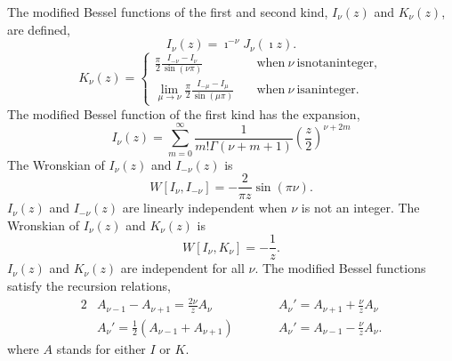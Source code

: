 \begin{Result}
  The modified Bessel functions of the first and second kind, $I_\nu(z)$ and 
  $K_\nu(z)$, are defined,
  \[ 
  I_\nu(z) = \imath^{-\nu} J_\nu(\imath z). 
  \]
  \[ K_\nu(z) = 
  \begin{cases}
    \frac{\pi}{2} \frac{I_{-\nu} - I_\nu}{\sin(\nu \pi)} 
    \quad &\mathrm{when}\ \nu\ \mathrm{is not an integer}, 
    \\
    \lim_{\mu \to \nu} \frac{\pi}{2} \frac{I_{-\mu} - I_\mu}{\sin(\mu \pi)} 
    \quad &\mathrm{when}\ \nu\ \mathrm{is an integer}.
  \end{cases}
  \]
  The modified Bessel function of the first kind has the expansion,
  \[
  I_\nu(z) = \sum_{m = 0}^\infty \frac{1}{m! \Gamma(\nu + m + 1)} \left( \frac{z}{2} \right)^{\nu+2m} 
  \]
  The Wronskian of $I_\nu(z)$ and $I_{-\nu}(z)$ is
  \[
  W[I_\nu,I_{-\nu}] = - \frac{2}{\pi z} \sin(\pi \nu).
  \]
  $I_\nu(z)$ and $I_{-\nu}(z)$ are linearly independent when $\nu$ is not an 
  integer.
  The Wronskian of $I_\nu(z)$ and $K_\nu(z)$ is
  \[
  W[I_\nu,K_\nu] = - \frac{1}{z}.
  \]
  $I_\nu(z)$ and $K_\nu(z)$ are independent for all $\nu$.
  The modified Bessel functions satisfy the recursion relations,
  \begin{alignat*}{2}
    &A_{\nu-1} - A_{\nu+1} = \frac{2\nu}{z} A_\nu &\qquad
    &A_\nu' = A_{\nu+1} + \frac{\nu}{z} A_\nu 
    \\
    &A_\nu' = \frac{1}{2} (A_{\nu-1} + A_{\nu+1}) &\qquad
    &A_\nu' = A_{\nu-1} - \frac{\nu}{z} A_\nu.
  \end{alignat*}
  where $A$ stands for either $I$ or $K$.
\end{Result}

















